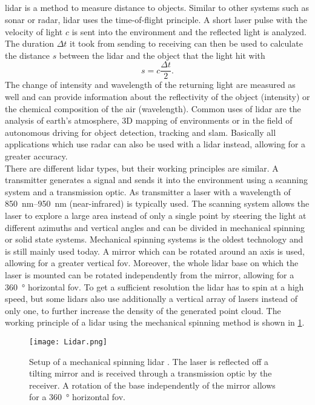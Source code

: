 \subsection{}
\gls{lidar} is a method to measure distance to objects.
Similar to other systems such as \gls{sonar} or \gls{radar}, \gls{lidar} uses the time-of-flight principle.
A short laser pulse with the velocity of light $c$ is sent into the environment and the reflected light is analyzed.
The duration $\Delta t$ it took from sending to receiving can then be used to calculate the distance $s$ between the \gls{lidar} and the object that the light hit with
\begin{equation}
	s = c\frac{\Delta t}{2}.
\end{equation}
The change of intensity and wavelength of the returning light are measured as well and can provide information about the reflectivity of the object (intensity) or the chemical composition of the air (wavelength).
Common uses of \gls{lidar} are the analysis of earth's atmosphere, 3D mapping of environments or in the field of autonomous driving for object detection, tracking and \gls{slam}.
Basically all applications which use \gls{radar} can also be used with a \gls{lidar} instead, allowing for a greater accuracy.\\
There are different \gls{lidar} types, but their working principles are similar.
A transmitter generates a signal and sends it into the environment using a scanning system and a transmission optic.
As transmitter a laser with a wavelength of \SIrange{850}{950}{\nano\metre} (near-infrared) is typically used.
The scanning system allows the laser to explore a large area instead of only a single point by steering the light at different azimuths and vertical angles and can be divided in mechanical spinning or solid state systems.
Mechanical spinning systems is the oldest technology and is still mainly used today.
A mirror which can be rotated around an axis is used, allowing for a greater vertical \gls{fov}.
Moreover, the whole \gls{lidar} base on which the laser is mounted can be rotated independently from the mirror, allowing for a \SI{360}{\degree} horizontal \gls{fov}.
To get a sufficient resolution the \gls{lidar} has to spin at a high speed, but some \glspl{lidar} also use additionally a vertical array of lasers instead of only one, to further increase the density of the generated point cloud.
The working principle of a \gls{lidar} using the mechanical spinning method is shown in \cref{fig:lidar}.
\begin{figure}[htb]
	\centering
	\texttt{[image: Lidar.png]}
	\caption[Setup of a mechanical spinning \acrshort{lidar}]{Setup of a mechanical spinning \acrshort{lidar} \cite{Li2020}. The laser is reflected off a tilting mirror and is received through a transmission optic by the receiver. A rotation of the base independently of the mirror allows for a \SI{360}{\degree} horizontal \gls{fov}.}
	\label{fig:lidar}
\end{figure}

